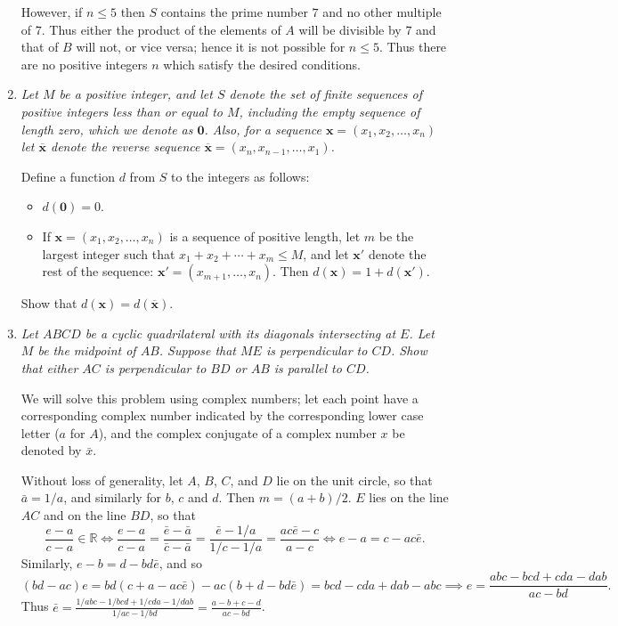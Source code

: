 \documentclass{article}
\begin{document}
\begin{enumerate}
However, if $n \leq 5$ then $S$ contains the prime number $7$ and no other multiple of $7$.
Thus either the product of the elements of $A$ will be divisible by $7$ and that of $B$ will not, or vice versa; hence it is not possible for $n \leq 5$.
Thus there are no positive integers $n$ which satisfy the desired conditions.


\medskip
\item %
{\itshape Let $M$ be a positive integer, and let $S$ denote the set of finite sequences of positive integers less than or equal to $M$, including the empty sequence of length zero, which we denote as $\mathbf{0}$.
Also, for a sequence $\mathbf{x} = (x_1, x_2, \dotsc, x_n)$ let $\overline{\mathbf{x}}$ denote the reverse sequence $\overline{\mathbf{x}} = (x_n, x_{n-1}, \dotsc, x_1)$.

Define a function $d$ from $S$ to the integers as follows:
\begin{itemize}
\item $d(\mathbf{0}) = 0$.
\item If $\mathbf{x} = (x_1, x_2, \dotsc, x_n)$ is a sequence of positive length, let $m$ be the largest integer such that $x_1 +x_2 +\dotsb +x_m \leq M$, and let $\mathbf{x}'$ denote the rest of the sequence: $\mathbf{x}' = (x_{m+1}, \dotsc, x_n)$.
Then $d(\mathbf{x}) = 1 +d(\mathbf{x}')$.
\end{itemize}
Show that $d(\mathbf{x}) = d(\overline{\mathbf{x}})$.}



\medskip
\item
{\itshape Let $ABCD$ be a cyclic quadrilateral with its diagonals intersecting at $E$.
Let $M$ be the midpoint of $AB$.
Suppose that $ME$ is perpendicular to $CD$.
Show that either $AC$ is perpendicular to $BD$ or $AB$ is parallel to $CD$.}

We will solve this problem using complex numbers; let each point have a corresponding complex number indicated by the corresponding lower case letter ($a$ for $A$), and the complex conjugate of a complex number $x$ be denoted by $\bar{x}$.

Without loss of generality, let $A$, $B$, $C$, and $D$ lie on the unit circle, so that $\bar{a} = 1/a$, and similarly for $b$, $c$ and $d$.
Then $m = (a+b)/2$.
$E$ lies on the line $AC$ and on the line $BD$, so that
\[ \frac{e-a}{c-a} \in \mathbb{R} \iff \frac{e-a}{c-a} = \frac{\bar{e}-\bar{a}}{\bar{c}-\bar{a}} = \frac{\bar{e}-1/a}{1/c-1/a} = \frac{ac\bar{e}-c}{a-c} \iff e-a = c-ac\bar{e}. \]
Similarly, $e-b = d-bd\bar{e}$, and so
\[ (bd-ac)e = bd(c+a-ac\bar{e}) -ac(b+d-bd\bar{e}) = bcd -cda +dab -abc \implies e = \frac{abc-bcd+cda-dab}{ac-bd}. \]
Thus $\bar{e} = \frac{1/abc -1/bcd +1/cda -1/dab}{1/ac -1/bd} = \frac{a-b+c-d}{ac-bd}$.


\end{enumerate}
\end{document}
